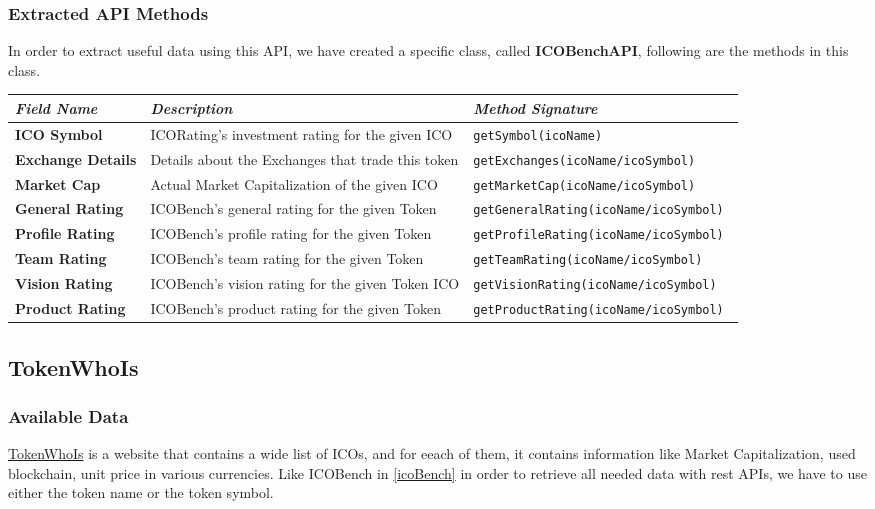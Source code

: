\subsubsection{Extracted API Methods}

In order to extract useful data using this API, we have created a specific class, called \textbf{ICOBenchAPI}, following are the methods in this class.
\begin{center}
\begin{tabular}{| C{2cm} | C{4cm} | C{7cm} |} \hline
    \textit{Field Name} & \textit{Description} & \textit{Method Signature}\\ \hline 
    \textbf{ICO Symbol} & ICORating's investment rating for the given ICO & \texttt{getSymbol(icoName)}\\ \hline 
    \textbf{Exchange Details} & Details about the Exchanges that trade this token & \texttt{getExchanges(icoName/icoSymbol)}\\ \hline 
    \textbf{Market Cap} & Actual Market Capitalization of the given ICO &
    \texttt{getMarketCap(icoName/icoSymbol)}\\ \hline
    \textbf{General Rating} & ICOBench's general rating for the given Token &
    \texttt{getGeneralRating(icoName/icoSymbol)
    }\\ \hline
    \textbf{Profile Rating} & ICOBench's profile rating for the given Token &
    \texttt{getProfileRating(icoName/icoSymbol)}\\ \hline 
    \textbf{Team Rating} & ICOBench's team rating for the given Token &
    \texttt{getTeamRating(icoName/icoSymbol)}\\ \hline 
    \textbf{Vision Rating} & ICOBench's vision rating for the given Token ICO &
    \texttt{getVisionRating(icoName/icoSymbol)}\\ \hline 
    \textbf{Product Rating} & ICOBench's product rating for the given Token &
    \texttt{getProductRating(icoName/icoSymbol)}\\ \hline
\end{tabular}
\end{center}

\subsection{TokenWhoIs}
\subsubsection{Available Data}
\href{https://tokenwhois.com/}{TokenWhoIs} is a website that contains a wide list of ICOs, and for eeach of them, it contains information like Market Capitalization, used blockchain, unit price in various currencies. \newline
Like ICOBench in \ref{icoBench} in order to retrieve all needed data with rest APIs, we have to use  either the token name or the token symbol. 
